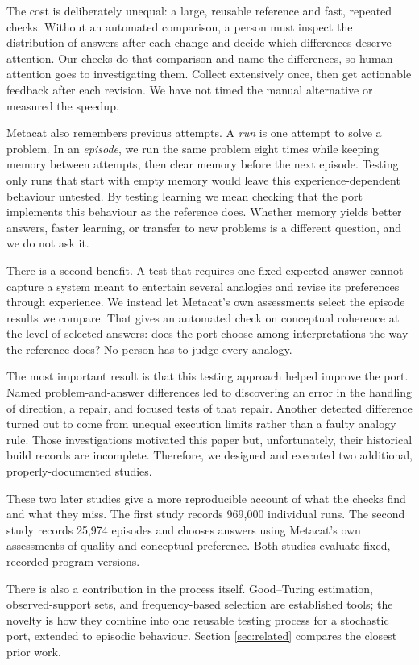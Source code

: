 \documentclass[10pt,letterpaper]{article}
\begin{document}
The cost is deliberately unequal: a large, reusable reference and fast, repeated checks.
Without an automated comparison, a person must inspect the distribution of answers after
each change and decide which differences deserve attention. Our checks do that comparison
and name the differences, so human attention goes to investigating them. Collect
extensively once, then get actionable feedback after each revision. We have not timed the
manual alternative or measured the speedup.

Metacat also remembers previous attempts. A \emph{run} is one attempt to solve a problem.
In an \emph{episode}, we run the same problem eight times while keeping memory between
attempts, then clear memory before the next episode. Testing only runs that start with
empty memory would leave this experience-dependent behaviour untested. By testing learning
we mean checking that the port implements this behaviour as the reference does. Whether
memory yields better answers, faster learning, or transfer to new problems is a different
question, and we do not ask it.

There is a second benefit. A test that requires one fixed expected answer cannot capture a
system meant to entertain several analogies and revise its preferences through experience.
We instead let Metacat's own assessments select the episode results we compare. That gives
an automated check on conceptual coherence at the level of selected answers: does the port
choose among interpretations the way the reference does? No person has to judge every
analogy.

The most important result is that this testing approach helped improve the port. Named
problem-and-answer differences led to discovering an error in the handling of direction, a
repair, and focused tests of that repair. Another detected difference turned out to come
from unequal execution limits rather than a faulty analogy rule. Those investigations
motivated this paper but, unfortunately, their historical build records are incomplete.
Therefore, we designed and executed two additional, properly-documented studies.

These two later studies give a more reproducible account of what the checks find and what
they miss. The first study records 969,000 individual runs. The second study records
25,974 episodes and chooses answers using Metacat's own assessments of quality and
conceptual preference. Both studies evaluate fixed, recorded program versions.

There is also a contribution in the process itself. Good--Turing estimation,
observed-support sets, and frequency-based selection are established tools; the novelty is
how they combine into one reusable testing process for a stochastic port, extended to
episodic behaviour. Section \ref{sec:related} compares the closest prior work.
\end{document}
